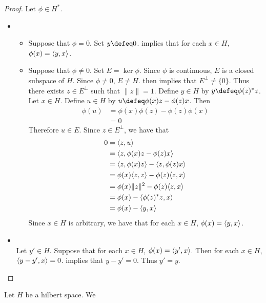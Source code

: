 \documentclass{book}
\begin{document}
\begin{proof} Let $\phi \in H^*$.
		\begin{itemize}
		\item {} \\
		\begin{itemize}
			\item Suppose that $\phi = 0$. Set $y \defeq 0$.  implies that for each $x \in H$, $\phi(x) = \langle y, x\rangle$. 
			\item Suppose that $\phi \neq 0$. Set $E = \ker \phi$. Since $\phi$ is continuous, $E$ is a closed subspace of $H$. Since $\phi \neq 0$, $E \neq H$.  then implies that $E^{\perp} \neq \{0\}$. Thus there exists $z \in E^{\perp}$ such that $\|z\| = 1$. Define $y \in H$ by $y \defeq \phi(z)^*z$. Let $x \in H$. Define $u \in H$ by $u \defeq \phi(x)z - \phi(z)x$. Then
			\begin{align*}
				\phi(u)
				& = \phi(x)\phi(z) - \phi(z)\phi(x) \\
				& = 0
			\end{align*}
			Therefore $u \in E$. Since $z \in E^{\perp}$, we have that 
			\begin{align*}
				0
				& = \langle z, u \rangle \\
				& = \langle z, \phi(x)z - \phi(z)x \rangle \\
					& =  \langle z, \phi(x)z \rangle -  \langle z, \phi(z)x \rangle \\
				& = \phi(x) \langle z, z \rangle - \phi(z) \langle z, x \rangle \\
				& = \phi(x) \|z\|^2 - \phi(z) \langle z, x \rangle \\ 
				& = \phi(x) - \langle \phi(z)^*z, x \rangle \\
				& = \phi(x) - \langle y, x \rangle 
			\end{align*}
			Since $x \in H$ is arbitrary, we have that for each $x \in H$, $\phi(x) = \langle y, x \rangle$.
		\end{itemize}
		\item {} \\
		Let $y' \in H$. Suppose that for each $x \in H$, $\phi(x) = \langle y', x \rangle$. Then for each $x \in H$, $\langle y - y', x \rangle = 0$.  implies that $y - y' = 0$. Thus $y' = y$. 
	\end{itemize}
\end{proof}

\begin{defn}
	Let $H$ be a hilbert space. We 
\end{defn}
\end{document}
